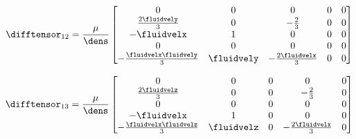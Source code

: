 \documentclass[../main.tex]{subfiles}
\begin{document}
\begin{minipage}{0.5\textwidth}
\def\kto{ \frac{2\fluidvely}{3} }
\def\keo{ -\fluidvelx }
\def\kso{ -\frac{\fluidvelx\fluidvely}{3} }
\def\ket{ 1 }
\def\kst{ \fluidvely }
\def\kte{ -\frac{2}{3} }
\def\kse{ -\frac{2\fluidvelx}{3} }
\begin{align}\nonumber
\difftensor_{12}=\frac{\mu}{\dens}
\begin{bmatrix}
  0     &    0     &    0     &    0     &    0     \\
  \kto  &    0     &    \kte  &    0     &    0     \\
  \keo  &    \ket  &    0     &    0     &    0     \\
  0     &    0     &    0     &    0     &    0     \\
  \kso  &    \kst  &    \kse  &    0     &    0     \\
\end{bmatrix}
\end{align}
\end{minipage}
\begin{minipage}{0.5\textwidth}
\def\kto{ \frac{2\fluidvelz}{3} }
\def\kao{ -\fluidvelx }
\def\kso{ -\frac{\fluidvelx\fluidvelz}{3} }
\def\kao{ -\fluidvelx }
\def\kat{ 1 }
\def\kst{ \fluidvelz }
\def\kta{ -\frac{2}{3} }
\def\ksa{ -\frac{2\fluidvelx}{3} }
\begin{align}\nonumber
\difftensor_{13}=\frac{\mu}{\dens}
\begin{bmatrix}
  0     &    0     &    0     &    0     &    0     \\ %
  \kto  &    0     &    0     &    \kta  &    0     \\ %
  0     &    0     &    0     &    0     &    0     \\ %
  \kao  &    \kat  &    0     &    0     &    0     \\ %
  \kso  &    \kst  &    0     &    \ksa  &    0     \\ %
\end{bmatrix}
\end{align}

\end{minipage}
\end{document}
